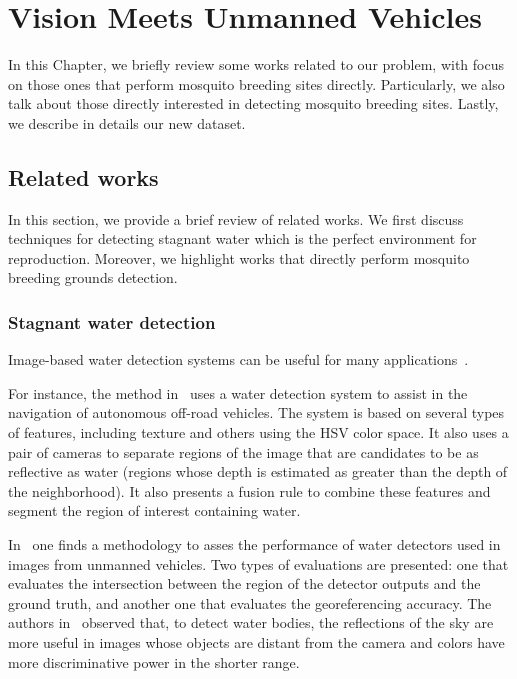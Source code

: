 \chapter{Vision Meets Unmanned Vehicles}
\label{chap:database}

In this Chapter, we briefly review some works related to our problem, with focus on those ones that perform mosquito breeding sites directly.
Particularly, we also talk about those directly interested in detecting mosquito breeding sites.
Lastly, we describe in details our new dataset.

\section{Related works}\label{sec:trab_rel}
In this section, we provide a brief review of related works.
We first discuss techniques for detecting stagnant water which is the perfect environment for \Aedes reproduction.
Moreover, we highlight works that directly perform mosquito breeding grounds detection.

%
\subsection{Stagnant water detection}
Image-based water detection systems can be useful for many applications~\cite{Rankin2006, Rankin2010a, Rankin2010b, Zhang2010b, Rankin2011a, Santana2012a, Zhong2013a}.

For instance, the method in~\cite{Rankin2006} uses a water detection system to assist in the navigation of autonomous off-road vehicles.
The system is based on several types of features, including texture and others using the HSV color space.
It also uses a pair of cameras to separate regions of the image that are candidates to be as reflective as water (regions whose depth is estimated as greater than the depth of the neighborhood).
It also presents a fusion rule to combine these features and segment the region of interest containing water.

In~\cite{Rankin2010a} one finds a methodology to asses the performance of water detectors used in images from unmanned vehicles.
Two types of evaluations are presented: one that evaluates the intersection between the region of the detector outputs and the ground truth, and another one that evaluates the georeferencing accuracy.
The authors in~\cite{Rankin2010b} observed that, to detect water bodies, the reflections of the sky are more useful in images whose objects are distant from the camera and colors have more discriminative power in the shorter range.

